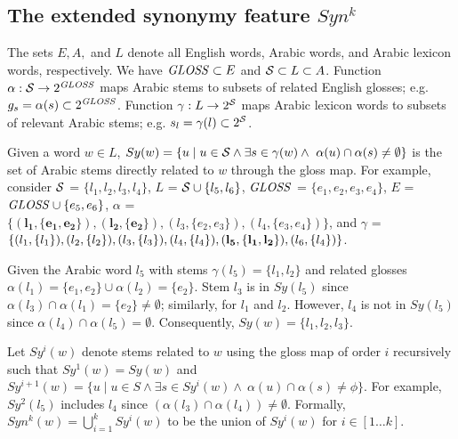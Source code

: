 \subsection{The extended synonymy feature $Syn^k$}

The sets $E, A,$ and $L$ denote all English words, Arabic words, 
and Arabic lexicon words, respectively. 
We have $\mathit{GLOSS} \subset E$ and $\ss \subset L \subset A$. 
Function $\alpha: \ss \rightarrow 2^{\GG}$ maps Arabic stems to 
subsets of related English glosses; e.g. $g_{s} = \alpha(s)\subset 2^{\mathit{GLOSS}}$.
Function $\gamma: L \rightarrow 2^{\ss}$ maps Arabic lexicon words to subsets 
of relevant Arabic stems; e.g. $s_{l} = \gamma(l)\subset 2^{\ss}$.

Given a word $w\in L$, 
$Sy(w)=\{u\mid u\in \ss \land\exists s\in \gamma(w)\land~\alpha(u)\cap\alpha(s)\neq\emptyset\}$
is the set of Arabic stems 
directly related to $w$ through the gloss map.
For example, consider %
$\ss$ = $\{l_{1}, l_{2}, l_{3}, l_{4}\}$, 
$L$ = $\ss \cup \{l_{5}, l_{6}\}$,
$\mathit{GLOSS}$ = $\{e_{1}, e_{2}, e_{3}, e_{4}\}$, 
$E$ = $\mathit{GLOSS} \cup \{e_{5}, e_{6}\}$, 
$\alpha$ = $\{ \mathbf{(l_{1}, \{e_{1}, e_{2}\})}, 
\mathbf{(l_{2}, \{e_{2}\})}, (l_{3}, \{e_{2}, e_{3}\}),
(l_{4}, \{e_{3}, e_{4}\})\}$,  and 
$\gamma$ = $\{ (l_{1}, \{l_{1}\}),  
  (l_{2}, \{l_{2}\}),  (l_{3},  \{l_{3}\}), (l_{4},  \{l_{4}\}), \\
\mathbf{(l_{5}, \{l_{1}, l_{2}\})},  (l_{6}, \{l_{4}\})\}$. 

Given the Arabic word $l_{5}$ with stems
$\gamma(l_5) = \{l_{1},l_{2}\}$ and related glosses
$\alpha(l_{1}) = \{e_{1},e_{2}\} \cup \alpha(l_{2}) = \{e_{2}\}$. 
Stem $l_3$ is in $Sy(l_5)$ since $\alpha(l_{3})\cap\alpha(l_{1}) = \{e_{2}\}\not=\emptyset$;
similarly, for  $l_1$ and $l_2$. However, $l_4$ is not in $Sy(l_5)$ since 
$\alpha(l_{4})\cap\alpha(l_{5}) = \emptyset$.
Consequently, $Sy(w) = \{l_{1},l_{2},l_{3}\}$.

Let $Sy^{i}(w)$ denote stems related to $w$ using the gloss map of order $i$ recursively such that
$Sy^{1}(w) = Sy(w)$ and
$Sy^{i+1}(w)=\{u\mid u\in S\land\exists s\in Sy^{i}(w)\land~\alpha(u)\cap\alpha(s)\neq\phi\}$.
For example, $Sy^{2}(l_{5})$ includes  $l_{4}$ since $(\alpha(l_{3})\cap\alpha(l_{4}))\neq\emptyset$. 
Formally, $Syn^k(w) = \bigcup\limits_{i=1}^{k} Sy^{i}(w)$
to be the union of $Sy^{i}(w)$ for $i\in[1 \ldots k]$.

